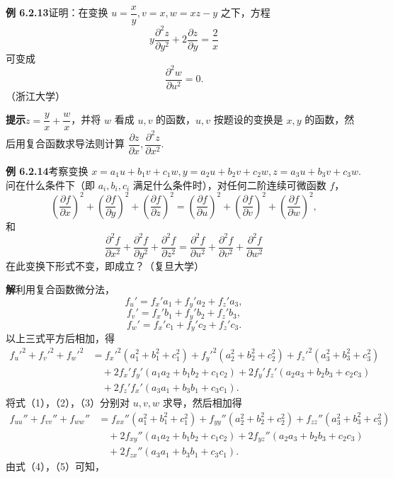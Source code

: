 \documentclass[UTF8,12pt,a4paper,fontset=fandol]{ctexart}
\begin{document}
\noindent\textbf{例 6.2.13}\quad 证明：在变换 $u=\dfrac{x}{y},v=x,w=xz-y$ 之下，方程
\[
  y\frac{\partial^2z}{\partial y^2}+2\frac{\partial z}{\partial y}=\frac2x
\]
可变成
\[
  \frac{\partial^2w}{\partial u^2}=0.
\]
（浙江大学）

\noindent\textbf{提示}\quad $z=\dfrac yx+\dfrac wx$，并将 $w$ 看成 $u,v$ 的函数，$u,v$ 按题设的变换是 $x,y$ 的函数，然后用复合函数求导法则计算 $\dfrac{\partial z}{\partial x},\dfrac{\partial^2z}{\partial x^2}$.

\noindent\textbf{例 6.2.14}\quad 考察变换 $x=a_1u+b_1v+c_1w,y=a_2u+b_2v+c_2w,z=a_3u+b_3v+c_3w$. 问在什么条件下（即 $a_i,b_i,c_i$ 满足什么条件时），对任何二阶连续可微函数 $f$，
\[
  \left(\frac{\partial f}{\partial x}\right)^2+
  \left(\frac{\partial f}{\partial y}\right)^2+
  \left(\frac{\partial f}{\partial z}\right)^2
  =
  \left(\frac{\partial f}{\partial u}\right)^2+
  \left(\frac{\partial f}{\partial v}\right)^2+
  \left(\frac{\partial f}{\partial w}\right)^2,
\]
和
\[
  \frac{\partial^2f}{\partial x^2}+\frac{\partial^2f}{\partial y^2}+\frac{\partial^2f}{\partial z^2}
  =
  \frac{\partial^2f}{\partial u^2}+\frac{\partial^2f}{\partial v^2}+\frac{\partial^2f}{\partial w^2}
\]
在此变换下形式不变，即成立？（复旦大学）

\noindent\textbf{解}\quad 利用复合函数微分法，
\[
  f_u'=f_x'a_1+f_y'a_2+f_z'a_3, \tag{1}
\]
\[
  f_v'=f_x'b_1+f_y'b_2+f_z'b_3, \tag{2}
\]
\[
  f_w'=f_x'c_1+f_y'c_2+f_z'c_3. \tag{3}
\]
以上三式平方后相加，得
\begin{equation}
\begin{aligned}
f_u'^2+f_v'^2+f_w'^2
&=f_x'^2(a_1^2+b_1^2+c_1^2)+f_y'^2(a_2^2+b_2^2+c_2^2)+f_z'^2(a_3^2+b_3^2+c_3^2)\\
&\quad+2f_x'f_y'(a_1a_2+b_1b_2+c_1c_2)
+2f_y'f_z'(a_2a_3+b_2b_3+c_2c_3)\\
&\quad+2f_z'f_x'(a_3a_1+b_3b_1+c_3c_1).
\end{aligned}
\tag{4}
\end{equation}
将式（1），（2），（3）分别对 $u,v,w$ 求导，然后相加得
\begin{equation}
\begin{aligned}
f_{uu}''+f_{vv}''+f_{ww}''
&=f_{xx}''(a_1^2+b_1^2+c_1^2)+f_{yy}''(a_2^2+b_2^2+c_2^2)+f_{zz}''(a_3^2+b_3^2+c_3^2)\\
&\quad+2f_{xy}''(a_1a_2+b_1b_2+c_1c_2)
+2f_{yz}''(a_2a_3+b_2b_3+c_2c_3)\\
&\quad+2f_{zx}''(a_3a_1+b_3b_1+c_3c_1).
\end{aligned}
\tag{5}
\end{equation}
由式（4），（5）可知，
\end{document}
